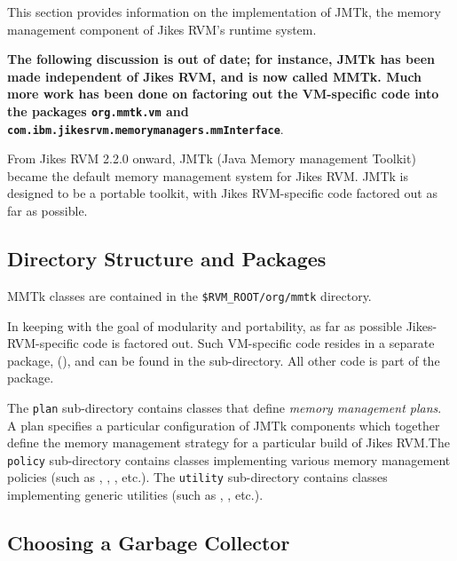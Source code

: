 
This section provides information on the implementation of JMTk, the
memory management component of Jikes\TMweb{} RVM's runtime system.

{\bf The following discussion is out of date; for instance, JMTk has been
made independent of Jikes RVM, and is now called MMTk.  Much more work
has been done on factoring out the VM-specific code into the
packages \texttt{org.mmtk.vm}
and \texttt{com.ibm.jikesrvm.memorymanagers.mmInterface}}. 

From Jikes RVM 2.2.0 onward, JMTk (Java Memory management
Toolkit) became the default memory management system for Jikes RVM.\@
JMTk is designed to be a portable toolkit, with Jikes
RVM-specific code factored out as far as possible.

\subsection{Directory Structure and Packages} \label{sssec:directories}

MMTk classes are contained in the
\texttt{\$RVM\_\-ROOT/org/mmtk} directory.

In keeping with the goal of modularity and portability, as far as
possible Jikes-RVM-specific code is factored out.  Such VM-specific
code resides in a separate package,
(),
and can be found in the \texttt{\mmInterface} sub-directory.  All other
code is part of the
package.

The \texttt{plan} sub-directory contains classes that define
\emph{memory management plans}.  A plan specifies a particular
configuration of JMTk components which together define the memory
management strategy for a particular build of Jikes RVM.\@  The
\texttt{policy} sub-directory contains classes implementing various
memory management policies (such as , , , etc.).  The \texttt{utility}
sub-directory contains classes implementing generic utilities (such as
,
, etc.).

\subsection{Choosing a Garbage Collector} \label{ssec:choosinggc}

